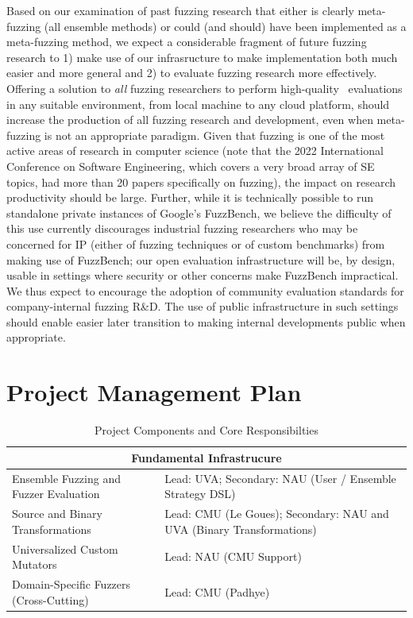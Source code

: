 Based on our examination of past fuzzing research that either is
clearly meta-fuzzing (all ensemble methods) or could (and should)
have been implemented as a meta-fuzzing method, we expect a
considerable fragment of future fuzzing research to 1) make
use of our infrasructure to make implementation both much easier and
more general and 2) to evaluate fuzzing research more effectively.
Offering a solution to \emph{all} fuzzing researchers to perform
high-quality~\cite{FuzzerHicks} evaluations in any suitable
environment, from local machine to any cloud platform, should increase
the production of all fuzzing research and development, even when
meta-fuzzing is not an appropriate paradigm.  Given that fuzzing is
one of the most active areas of research in computer science (note
that the 2022 International Conference on Software Engineering, which
covers a very broad array of SE topics, had more than 20 papers
specifically on fuzzing), the impact on research productivity should
be large.  Further, while it is technically possible to run standalone
private instances of Google's FuzzBench, we believe the difficulty of
this use currently discourages industrial fuzzing researchers who may
be concerned for IP (either of fuzzing techniques or of custom
benchmarks) from making use of FuzzBench; our open evaluation
infrastructure will be, by design, usable in settings where security
or other concerns make FuzzBench impractical.  We thus expect to
encourage the adoption of community evaluation standards for
company-internal fuzzing R\&D.  The use of public infrastructure in
such settings should enable easier later transition to making internal
developments public when appropriate.

\section{Project Management Plan}

%
\label{sec:plan}


\begin{table}
 \begin{tabularx}{\textwidth}{|p{7.5cm}|X|}
   \hline
   \multicolumn{2}{|c|}{Fundamental Infrastrucure} \\
   \hline
    Ensemble Fuzzing and
    Fuzzer Evaluation & Lead: UVA; Secondary: NAU (User / Ensemble
    Strategy DSL)\\
   \hline
    Source and Binary Transformations & Lead: CMU (Le
    Goues); Secondary: NAU and UVA (Binary Transformations)\\
   \hline
    Universalized Custom Mutators & Lead: NAU (CMU Support)\\
   \hline
     Domain-Specific Fuzzers (Cross-Cutting) & Lead: CMU (Padhye) \\
   \hline
  \end{tabularx}
  \caption{\label {tab:thrusts} Project Components and Core Responsibilties}
\end{table}

